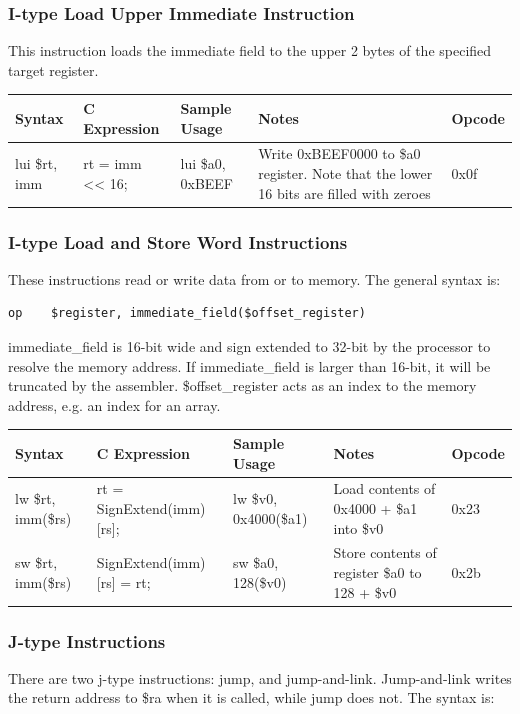 \documentclass{article}
\begin{document}
\subsubsection{I-type Load Upper Immediate Instruction}
This instruction loads the immediate field to the upper 2 bytes of the specified target register. 

\begin{tabular}{| l | l | l | p{5cm} | l |}
\hline
Syntax & C Expression & Sample Usage & Notes & Opcode \\
\hline
lui \$rt, imm & rt = imm << 16; & lui \$a0, 0xBEEF & Write 0xBEEF0000 to \$a0 register. Note that the lower 16 bits are filled with zeroes & 0x0f \\
\hline
\end{tabular}

\subsubsection{I-type Load and Store Word Instructions}
These instructions read or write data from or to memory. The general syntax is: 

\begin{verbatim}
op    $register, immediate_field($offset_register)
\end{verbatim}

immediate\_field is 16-bit wide and sign extended to 32-bit by the processor to resolve the memory address. If immediate\_field is larger than 16-bit, it will be truncated by the assembler. \$offset\_register acts as an index to the memory address, e.g. an index for an array. 

\begin{tabular}{| l | l | l | p{5cm} | l |}
\hline
Syntax & C Expression & Sample Usage & Notes & Opcode \\
\hline
lw \$rt, imm(\$rs) & rt = SignExtend(imm)[rs]; & lw \$v0, 0x4000(\$a1) & Load contents of 0x4000 + \$a1 into \$v0 & 0x23 \\
sw \$rt, imm(\$rs) & SignExtend(imm)[rs] = rt; & sw \$a0, 128(\$v0) & Store contents of register \$a0 to 128 + \$v0 & 0x2b \\
\hline
\end{tabular}

\subsubsection{J-type Instructions}
There are two j-type instructions: jump, and jump-and-link. Jump-and-link writes the return address to \$ra when it is called, while jump does not. The syntax is: 
\end{document}
